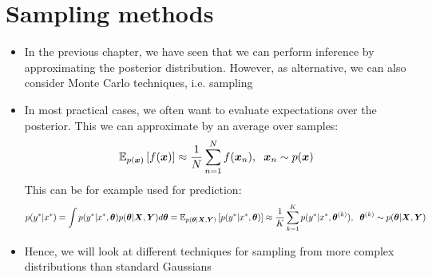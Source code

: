 \section{Sampling methods}
\begin{itemize}
	\item In the previous chapter, we have seen that we can perform inference by approximating the posterior distribution. However, as alternative, we can also consider Monte Carlo techniques, i.e. sampling
	\item In most practical cases, we often want to evaluate expectations over the posterior. This we can approximate by an average over samples:
	$$\mathbb{E}_{p(\bm{x})}\left[f(\bm{x})\right] \approx \frac{1}{N}\sum_{n=1}^{N} f(\bm{x}_n), \hspace{2mm} \bm{x}_n\sim p(\bm{x})$$
	This can be for example used for prediction:
	$$p(y^{*}|x^{*}) = \int p(y^{*}\vert x^{*}, \bm{\theta})p(\bm{\theta}|\bm{X}, \bm{Y})d\bm{\theta} = \mathbb{E}_{p(\bm{\theta}|\bm{X}, \bm{Y})}\left[p(y^{*}\vert x^{*}, \bm{\theta})\right] \approx \frac{1}{K}\sum_{k=1}^{K} p(y^{*}\vert x^{*}, \bm{\theta}^{(k)}), \hspace{2mm} \bm{\theta}^{(k)}\sim p(\bm{\theta}|\bm{X}, \bm{Y})$$
	\item Hence, we will look at different techniques for sampling from more complex distributions than standard Gaussians
\end{itemize}
